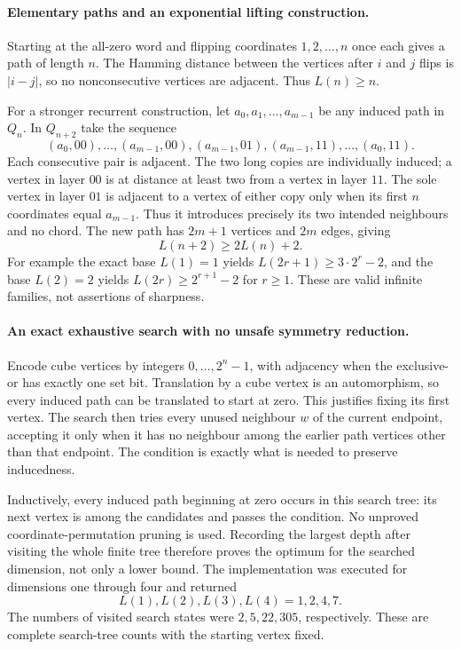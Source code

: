 \documentclass[11pt,a4paper]{article}
\begin{document}
\paragraph{Elementary paths and an exponential lifting construction.}
Starting at the all-zero word and flipping coordinates $1,2,\ldots,n$
once each gives a path of length $n$. The Hamming distance between
the vertices after $i$ and $j$ flips is $|i-j|$, so no nonconsecutive
vertices are adjacent. Thus $L(n)\ge n$.

For a stronger recurrent construction, let
$a_0,a_1,\ldots,a_{m-1}$ be any induced path in $Q_n$. In $Q_{n+2}$
take the sequence
\[
 (a_0,00),\ldots,(a_{m-1},00),
 (a_{m-1},01),
 (a_{m-1},11),\ldots,(a_0,11).
\]
Each consecutive pair is adjacent. The two long copies are individually
induced; a vertex in layer $00$ is at distance at least two from a
vertex in layer $11$. The sole vertex in layer $01$ is adjacent to
a vertex of either copy only when its first $n$ coordinates equal
$a_{m-1}$. Thus it introduces precisely its two intended neighbours
and no chord. The new path has $2m+1$ vertices and $2m$ edges, giving
\[
                         L(n+2)\ge2L(n)+2.
\]
For example the exact base $L(1)=1$ yields $L(2r+1)\ge3\cdot2^r-2$,
and the base $L(2)=2$ yields $L(2r)\ge2^{r+1}-2$ for $r\ge1$.
These are valid infinite families, not assertions of sharpness.

\paragraph{An exact exhaustive search with no unsafe symmetry reduction.}
Encode cube vertices by integers $0,\ldots,2^n-1$, with adjacency
when the exclusive-or has exactly one set bit. Translation by a cube
vertex is an automorphism, so every induced path can be translated to
start at zero. This justifies fixing its first vertex. The search then
tries every unused neighbour $w$ of the current endpoint, accepting it
only when it has no neighbour among the earlier path vertices other
than that endpoint. The condition is exactly what is needed to preserve
inducedness.

Inductively, every induced path beginning at zero occurs in this search
tree: its next vertex is among the candidates and passes the condition.
No unproved coordinate-permutation pruning is used. Recording the
largest depth after visiting the whole finite tree therefore proves
the optimum for the searched dimension, not only a lower bound.
The implementation was executed for dimensions one through four and
returned
\[
                            L(1),L(2),L(3),L(4)=1,2,4,7.
\]
The numbers of visited search states were $2,5,22,305$, respectively.
These are complete search-tree counts with the starting vertex fixed.
\end{document}
